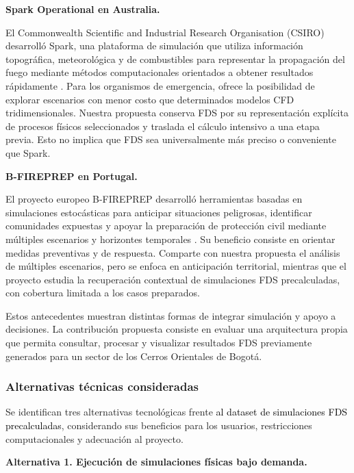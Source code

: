 \textbf{Spark Operational en Australia.}

El Commonwealth Scientific and Industrial Research Organisation (CSIRO) desarrolló Spark, una plataforma de simulación que utiliza información topográfica, meteorológica y de combustibles para representar la propagación del fuego mediante métodos computacionales orientados a obtener resultados rápidamente \cite{vfpCSIROSpark}. Para los organismos de emergencia, ofrece la posibilidad de explorar escenarios con menor costo que determinados modelos CFD tridimensionales. Nuestra propuesta conserva FDS por su representación explícita de procesos físicos seleccionados y traslada el cálculo intensivo a una etapa previa. Esto no implica que FDS sea universalmente más preciso o conveniente que Spark.

\begin{samepage}
\textbf{B-FIREPREP en Portugal.}

El proyecto europeo B-FIREPREP desarrolló herramientas basadas en simulaciones estocásticas para anticipar situaciones peligrosas, identificar comunidades expuestas y apoyar la preparación de protección civil mediante múltiples escenarios y horizontes temporales \cite{vfpBFIREPREP}. Su beneficio consiste en orientar medidas preventivas y de respuesta. Comparte con nuestra propuesta el análisis de múltiples escenarios, pero se enfoca en anticipación territorial, mientras que el proyecto estudia la recuperación contextual de simulaciones FDS precalculadas, con cobertura limitada a los casos preparados.
\end{samepage}

Estos antecedentes muestran distintas formas de integrar simulación y apoyo a decisiones. La contribución propuesta consiste en evaluar una arquitectura propia que permita consultar, procesar y visualizar resultados FDS previamente generados para un sector de los Cerros Orientales de Bogotá.

\subsubsection{Alternativas técnicas consideradas}

Se identifican tres alternativas tecnológicas frente \textcolor{black}{al dataset de simulaciones FDS precalculadas}, considerando sus beneficios para los usuarios, restricciones computacionales y adecuación al proyecto.

\textbf{Alternativa 1. Ejecución de simulaciones físicas bajo demanda.}


